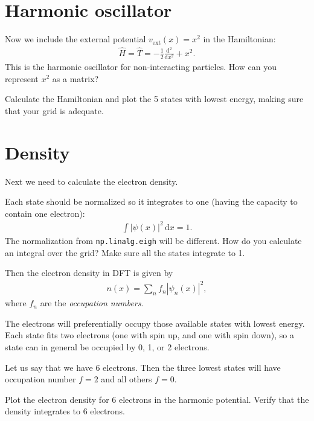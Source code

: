\documentclass{article}
\newcommand{\exercise}[1]{
  \bigskip
  \begin{boxedminipage}[c]{0.8\linewidth}
  #1
  \end{boxedminipage}
  \bigskip
}
\newcommand{\dee}[0]{\mathrm d}
\newcommand{\idee}[0]{\,\dee}
\newcommand{\diff}[2]{\frac{\dee #1}{\dee #2}}
\begin{document}
\section{Harmonic oscillator}
Now we include the external potential $v_{\mathrm{ext}}(x) = x^2$ in the Hamiltonian:
\begin{align}
  \hat H = \hat T = -\frac12 \diff{^2}{x^2} + x^2.
\end{align}
This is the harmonic oscillator for non-interacting particles.
How can you represent $x^2$ as a matrix?


\exercise{
Calculate the Hamiltonian and plot the 5 states with lowest energy,
making sure that your grid is adequate.
}

\section{Density}
Next we need to calculate the electron density.

Each state should be normalized so it integrates to one (having the
capacity to contain one electron):
\begin{align}
  \int |\psi(x)|^2 \idee x = 1.
\end{align}
The normalization from \texttt{np.linalg.eigh} will be different.
How do you calculate an integral over the grid?
Make sure all the states integrate to 1.

Then the electron density in DFT is given by
\begin{align}
  n(x) = \sum_n f_n |\psi_n(x)|^2,
\end{align}
where $f_n$ are the \emph{occupation numbers}.

The electrons will
preferentially occupy those available states with lowest energy.  Each
state fits two electrons (one with spin up, and one with spin down), so
a state can in general be occupied by 0, 1, or 2 electrons.

Let us say that we have 6 electrons.  Then the three lowest states
will have occupation number $f=2$ and all others $f=0$.

Plot the electron density for 6 electrons in the harmonic potential.
Verify that the density integrates to 6 electrons.
\end{document}
